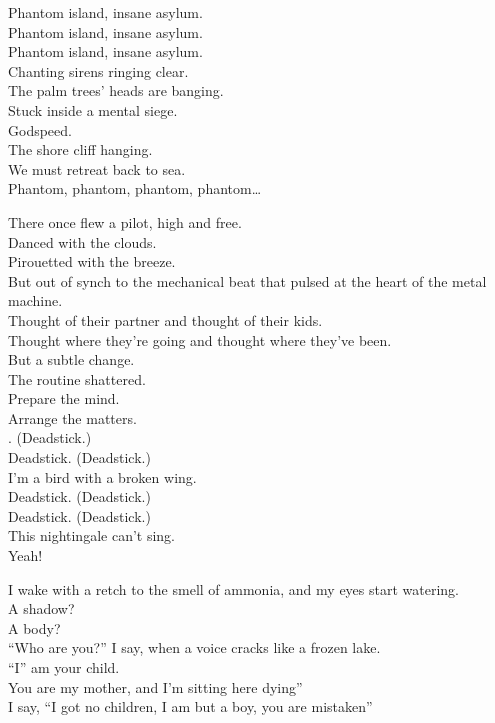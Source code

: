 Phantom island, insane asylum. \\
Phantom island, insane asylum. \\
Phantom island, insane asylum. \\
Chanting sirens ringing clear. \\

The palm trees' heads are banging. \\
Stuck inside a mental siege. \\
Godspeed. \\
The shore cliff hanging. \\
We must retreat back to sea. \\

Phantom, phantom, phantom, phantom… \\





There once flew a pilot, high and free. \\
Danced with the clouds. \\
Pirouetted with the breeze. \\
But out of synch to the mechanical beat that pulsed at the heart of the metal machine. \\
Thought of their partner and thought of their kids. \\
Thought where they're going and thought where they've been. \\
But a subtle change. \\
The routine shattered. \\
Prepare the mind. \\
Arrange the matters. \\

. (Deadstick.) \\
Deadstick. (Deadstick.) \\
I'm a bird with a broken wing. \\
Deadstick. (Deadstick.) \\
Deadstick. (Deadstick.) \\
This nightingale can't sing. \\
Yeah! \\


I wake with a retch to the smell of ammonia, and my eyes start watering. \\
A shadow? \\
A body? \\
``Who are you?'' I say, when a voice cracks like a frozen lake. \\
``I'' am your child. \\
You are my mother, and I'm sitting here dying'' \\
I say, ``I got no children, I am but a boy, you are mistaken'' \\

